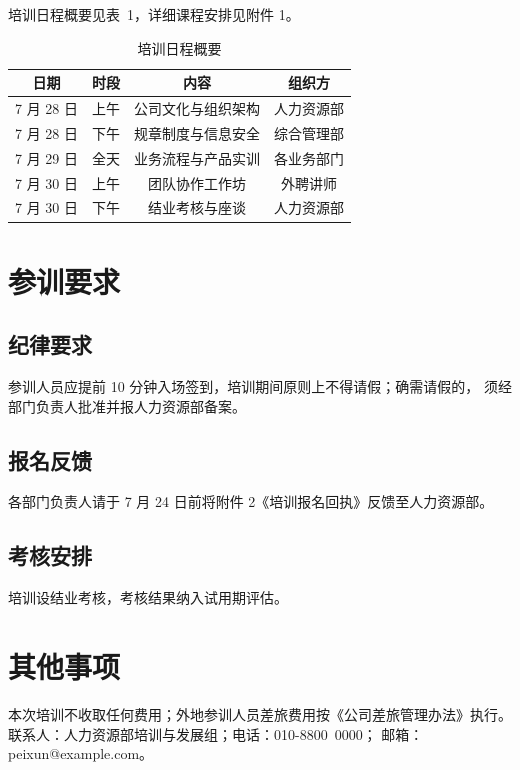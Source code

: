 \documentclass[zihao=-4]{ctexart}   %
\begin{document}
培训日程概要见表~1，详细课程安排见附件 1。

\begin{table}[htbp]
  \centering
  \caption{培训日程概要}
  \renewcommand{\arraystretch}{1.5}
  \begin{tabular}{|c|c|c|c|}
    \hline
    \textbf{日期} & \textbf{时段} & \textbf{内容} & \textbf{组织方} \\
    \hline
    7 月 28 日 & 上午 & 公司文化与组织架构 & 人力资源部 \\
    \hline
    7 月 28 日 & 下午 & 规章制度与信息安全 & 综合管理部 \\
    \hline
    7 月 29 日 & 全天 & 业务流程与产品实训 & 各业务部门 \\
    \hline
    7 月 30 日 & 上午 & 团队协作工作坊 & 外聘讲师 \\
    \hline
    7 月 30 日 & 下午 & 结业考核与座谈 & 人力资源部 \\
    \hline
  \end{tabular}
\end{table}

\section{参训要求}

\subsection{纪律要求}

参训人员应提前 10 分钟入场签到，培训期间原则上不得请假；确需请假的，
须经部门负责人批准并报人力资源部备案。

\subsection{报名反馈}

各部门负责人请于 7 月 24 日前将附件 2《培训报名回执》反馈至人力资源部。

\subsection{考核安排}

培训设结业考核，考核结果纳入试用期评估。

\section{其他事项}

本次培训不收取任何费用；外地参训人员差旅费用按《公司差旅管理办法》执行。
联系人：人力资源部培训与发展组；电话：010-8800~0000；
邮箱：peixun@example.com。
\end{document}
